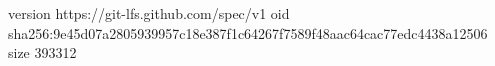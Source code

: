 version https://git-lfs.github.com/spec/v1
oid sha256:9e45d07a2805939957c18e387f1c64267f7589f48aac64cac77edc4438a12506
size 393312
